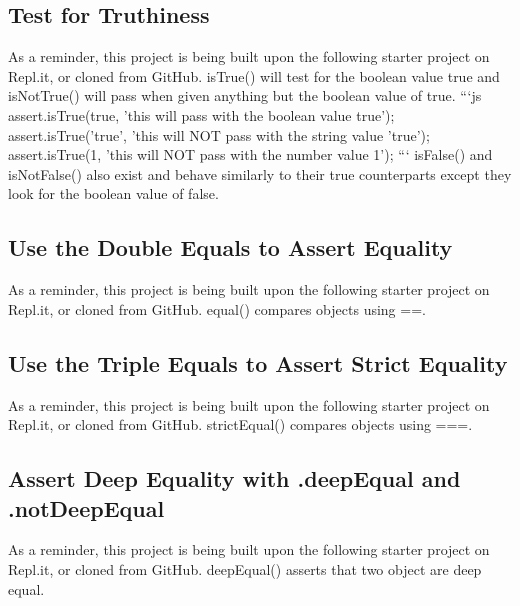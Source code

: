 \documentclass{article}%
\begin{document}
\subsection{Test for Truthiness}%
\label{subsec:TestforTruthiness}%
As a reminder, this project is being built upon the following starter project on Repl.it, or cloned from GitHub.\newline%
isTrue() will test for the boolean value true and isNotTrue() will pass when given anything but the boolean value of true.\newline%
```js\newline%
assert.isTrue(true, 'this will pass with the boolean value true');\newline%
assert.isTrue('true', 'this will NOT pass with the string value 'true');\newline%
assert.isTrue(1, 'this will NOT pass with the number value 1');\newline%
```\newline%
isFalse() and isNotFalse() also exist and behave similarly to their true counterparts except they look for the boolean value of false. \newline%

%
\subsection{Use the Double Equals to Assert Equality}%
\label{subsec:UsetheDoubleEqualstoAssertEquality}%
As a reminder, this project is being built upon the following starter project on Repl.it, or cloned from GitHub.\newline%
equal() compares objects using ==.\newline%

%
\subsection{Use the Triple Equals to Assert Strict Equality}%
\label{subsec:UsetheTripleEqualstoAssertStrictEquality}%
As a reminder, this project is being built upon the following starter project on Repl.it, or cloned from GitHub.\newline%
strictEqual() compares objects using ===.\newline%

%
\subsection{Assert Deep Equality with .deepEqual and .notDeepEqual}%
\label{subsec:AssertDeepEqualitywith.deepEqualand.notDeepEqual}%
As a reminder, this project is being built upon the following starter project on Repl.it, or cloned from GitHub.\newline%
deepEqual() asserts that two object are deep equal.\newline%
\end{document}
